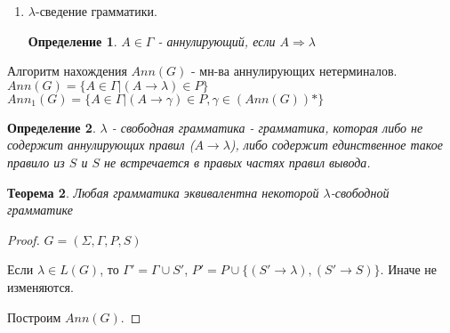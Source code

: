 \documentclass[11pt]{article}
\newtheorem*{df}{Определение}
\newtheorem*{theorem}{Теорема}
\theoremstyle{break}
\newtheorem*{proof}{Доказательство:}
\begin{document}
\begin{sloppypar}
\begin{enumerate}
  $\Gamma_1 = \Gamma \cup \{A|(B \rightarrow \alpha A \beta) \in P, B \in \Gamma\}$
  
  Алгоритм нахождения $\Gamma_p$ - мн-ва достижимых символов:
  $\Gamma = \{A|(A \rightarrow w) \in P\}$
  $\Gamma_1 = \Gamma \cup \{A|(A \rightarrow \gamma) \in P, \gamma \in (\Sigma \cup \Gamma)\}$
  
  \begin{theorem}
    Для любой КСГ $G$ существует эквивалентная ей приведенная грамматика.
  \end{theorem}
  \begin{proof}
    $G = (\Sigma, \Gamma, P, S)$
    
    Находим $\Gamma_p$. Если $S \notin \Gamma_p$, то $G' = (\Sigma, \O, \O, \O)$. Иначе $\overset{\triangle}{\Gamma} = (\Sigma, \Gamma_p, p', S)$
    
    $\overset{\triangle}{P} = \{(A \rightarrow \gamma) \in P|A, \gamma \in (\Sigma \cup \Gamma_p)\}$
    
    Находим $(\Gamma_p)_r$. Все символы будут достижимые и производящие в $G'$. Порядок важен.
  \end{proof}
  \item $\lambda$-сведение грамматики.
  \begin{df}
    $A \in \Gamma$ - аннулирующий, если $A \Rightarrow \lambda$
  \end{df}
\end{enumerate}
  Алгоритм нахождения $Ann(G)$ - мн-ва аннулирующих нетерминалов.
  $Ann(G) = \{A \in \Gamma|(A \rightarrow \lambda) \in P\}$
  $Ann_1(G) = \{A \in \Gamma|(A \rightarrow \gamma) \in P, \gamma \in (Ann(G))*\}$
  \begin{df}
    $\lambda$ - свободная грамматика - грамматика, которая либо не содержит аннулирующих правил ($A \rightarrow \lambda$), либо содержит единственное такое правило из $S$ и $S$ не встречается в правых частях правил вывода.
  \end{df}
  
  \begin{theorem}
    Любая грамматика эквивалентна некоторой $\lambda$-свободной грамматике
  \end{theorem}
  \begin{proof}
    $G = (\Sigma, \Gamma, P, S)$
    
    Если $\lambda \in L(G)$, то $\Gamma' = \Gamma \cup S'$, $P' = P \cup \{(S' \rightarrow \lambda), (S' \rightarrow S)\}$. Иначе не изменяются.
    
    Построим $Ann(G)$.    
    

\end{proof}
\end{sloppypar}
\end{document}
